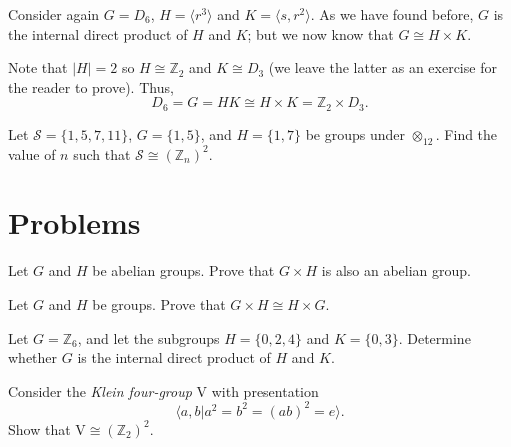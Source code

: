 \begin{example}
    Consider again $G = D_6$, $H = \langle r^3 \rangle$ and $K = \langle s, r^2 \rangle$. As we have found before, $G$ is the internal direct product of $H$ and $K$; but we now know that $G \cong H \times K$.

    Note that $|H| = 2$ so $H \cong \mathbb{Z}_2$ and $K \cong D_3$ (we leave the latter as an exercise for the reader to prove). Thus,
    \[
        D_6 = G = HK \cong H \times K = \mathbb{Z}_2 \times D_3.
    \]
\end{example}

\begin{exercise}
    Let $\mathcal{S} = \{1, 5, 7, 11\}$, $G = \{1, 5\}$, and $H = \{1, 7\}$ be groups under $\otimes_{12}$. Find the value of $n$ such that $\mathcal{S} \cong (\mathbb{Z}_n)^2$.
\end{exercise}

\newpage

\section{Problems}
\begin{problem}\label{problem-external-direct-product-of-abelian-groups-is-abelian}
    Let $G$ and $H$ be abelian groups. Prove that $G \times H$ is also an abelian group.
\end{problem}

\begin{problem}
    Let $G$ and $H$ be groups. Prove that $G \times H \cong H \times G$.
\end{problem}

\begin{problem}
    Let $G = \mathbb{Z}_6$, and let the subgroups $H = \{0, 2, 4\}$ and $K = \{0, 3\}$. Determine whether $G$ is the internal direct product of $H$ and $K$.
\end{problem}

\begin{problem}
    Consider the \textit{Klein four-group} $\mathrm{V}$ with presentation
    \[
        \langle a, b \vert a^2 = b^2 = (ab)^2 = e \rangle.
    \]
    Show that $\mathrm{V} \cong (\mathbb{Z}_2)^2$.
\end{problem}
